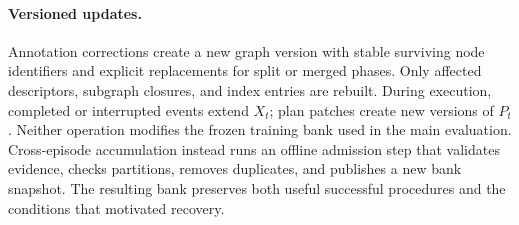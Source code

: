 \paragraph{Versioned updates.}
Annotation corrections create a new graph version with stable surviving node identifiers and explicit replacements for split or merged phases. Only affected descriptors, subgraph closures, and index entries are rebuilt. During execution, completed or interrupted events extend $X_t$; plan patches create new versions of $P_t$. Neither operation modifies the frozen training bank used in the main evaluation. Cross-episode accumulation instead runs an offline admission step that validates evidence, checks partitions, removes duplicates, and publishes a new bank snapshot. The resulting bank preserves both useful successful procedures and the conditions that motivated recovery.

